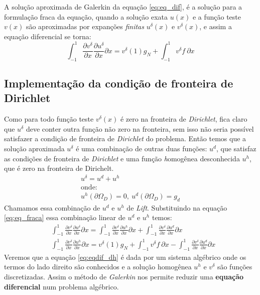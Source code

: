 A solução aproximada de Galerkin da equação \eqref{eq:eq_dif}, é a solução para a formulação fraca da equação, quando a solução exata $u(x)$ e a função teste $v(x)$ são aproximadas por expanções \emph{finitas} $u^\delta(x)$ e $v^\delta(x)$, e assim a  equação diferencial se torna:
\begin{equation}\label{eq:eqdif_neumann}
 \int^{1}_{-1} \frac{\partial v^\delta}{\partial x}  \frac{\partial u^\delta}{\partial x}  \partial x =  v^\delta(1)g_N + \int^{1}_{-1}  v^\delta f\ \partial x 
\end{equation}
\subsection{Implementação da condição de fronteira de Dirichlet}
 Como para todo função teste $v^\delta(x)$ é zero na fronteira de \emph{Dirichlet}, fica claro que $u^\delta$ deve conter outra função não zero na fronteira, sem isso não seria possível satisfazer a condição de fronteira de \emph{Dirichlet} do problema. Então temos que a solução aproximada $u^\delta$ é uma combinação de outras duas funções: $u^d$, que satisfaz as condições de fronteira de \emph{Dirichlet} e uma função \emph{h}omogênea desconhecida $u^h$, que é zero na fronteira de Dirichelt.
 \begin{align}
 u^\delta = u^d + u^h \\
 \text{onde:}\\
 u^h(\partial \Omega_D) = 0,\ u^d(\partial \Omega_D) = g_d
 \end{align}
 Chamamos essa combinação de $u^d$ e $u^h$ de \emph{Lift}. Substituindo na equação \ref{eq:eq_fraca} essa combinação linear de $u^d$ e $u^h$ temos:
 \begin{align}\label{eq:eqdif_dh}
 & \int^{1}_{-1} \frac{\partial v^\delta}{\partial x}  \frac{\partial u^\delta}{\partial x}  \partial x =  \int^{1}_{-1} \frac{\partial v^\delta}{\partial x}  \frac{\partial u^h}{\partial x}  \partial x  +  \int^{1}_{-1} \frac{\partial v^\delta}{\partial x}  \frac{\partial u^d}{\partial x}  \partial x \\
& \int^{1}_{-1} \frac{\partial v^\delta}{\partial x}  \frac{\partial u^h}{\partial x}  \partial x=  v^\delta(1)g_N + \int^{1}_{-1}  v^\delta f\ \partial x -    \int^{1}_{-1} \frac{\partial v^\delta}{\partial x}  \frac{\partial u^d}{\partial x}  \partial x 
 \end{align}
 Veremos que a equação \eqref{eq:eqdif_dh} é dada por um sistema algébrico onde os termos do lado direito são conhecidos e a solução homogênea $u^h$ e $v^\delta$ são funções discretizadas. Assim o método de \emph{Galerkin} nos permite reduzir uma \textbf{equação diferencial} num problema algébrico.

